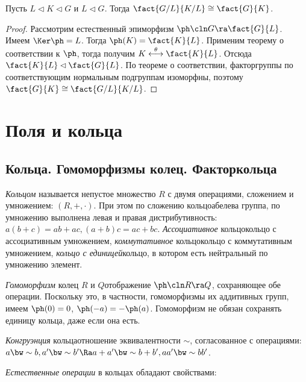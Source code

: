 \documentclass[a4paper]{article}
\newcommand{\kph}{\Ker \ph}
\begin{document}
\begin{theorem}
Пусть $L \lhd K \lhd G$ и $L \lhd G$. Тогда $\fact{G/L}{K/L} \cong \fact{G}{K}$.
\end{theorem}
\begin{proof}
Рассмотрим естественный эпиморфизм $\ph\cln G \ra \fact{G}{L}$. Имеем  $\kph = L$. Тогда $\ph(K) = \fact{K}{L}$.
Применим теорему о соответствии к $\ph$, тогда получим $K \overset{\theta}{\longleftrightarrow} \fact{K}{L}$.
Отсюда $\fact{K}{L} \lhd \fact{G}{L}$. По теореме о соответствии, факторгруппы по соответствующим нормальным
подгруппам изоморфны, поэтому $\fact{G}{K} \cong \fact{G/L}{K/L}$.
\end{proof}

\section{Поля и кольца}

\subsection{Кольца. Гомоморфизмы колец. Факторкольца}

\begin{df}
\emph{Кольцом} называется непустое множество $R$ с двумя операциями,  сложением и умножением:
$(R, +, \cdot)$. При этом по сложению кольцо\т абелева группа, по умножению выполнена левая и правая дистрибутивность:
$a(b+c)=ab+ac, (a+b)c=ac+bc$. \emph{Ассоциативное} кольцо\т кольцо с ассоциативным умножением,
\emph{коммутативное} кольцо\т кольцо с коммутативным умножением, \emph{кольцо с единицей}\т кольцо, в котором
есть нейтральный по умножению элемент.
\end{df}

\begin{df}
\emph{Гомоморфизм} колец $R$ и $Q$\т отображение $\ph\cln R \ra Q$, сохраняющее  обе операции. Поскольку это, в
частности, гомоморфизмы их аддитивных групп, имеем $\ph(0)=0$, $\ph(-a)=-\ph(a)$. Гомоморфизм не обязан
сохранять единицу кольца, даже если она есть.
\end{df}

\begin{df}
\emph{Конгруэнция} кольца\т отношение
эквивалентности $\sim$, согласованное с операциями: $a \bw\sim b, a' \bw\sim b' \Ra a+a' \bw\sim b+b', aa' \bw\sim bb'$.
\end{df}

\emph{Естественные операции} в кольцах обладают свойствами:
\end{document}
